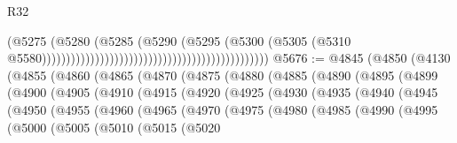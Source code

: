 \begin{lexlean}{R32}
\begin{coremodule}
                                                                                  (@5275
                                                                                    (@5280
                                                                                      (@5285
                                                                                        (@5290
                                                                                          (@5295
                                                                                            (@5300
                                                                                              (@5305
                                                                                                (@5310
                                                                                                  @5580)))))))))))))))))))))))))))))))))))))))))))))))
@5676 := @4845
    (@4850
      (@4130
        (@4855
          (@4860
            (@4865
              (@4870
                (@4875
                  (@4880
                    (@4885
                      (@4890
                        (@4895
                          (@4899
                            (@4900
                              (@4905
                                (@4910
                                  (@4915
                                    (@4920
                                      (@4925
                                        (@4930
                                          (@4935
                                            (@4940
                                              (@4945
                                                (@4950
                                                  (@4955
                                                    (@4960
                                                      (@4965
                                                        (@4970
                                                          (@4975
                                                            (@4980
                                                              (@4985
                                                                (@4990
                                                                  (@4995
                                                                    (@5000
                                                                      (@5005
                                                                        (@5010
                                                                          (@5015
                                                                            (@5020

\end{coremodule}
\end{lexlean}
